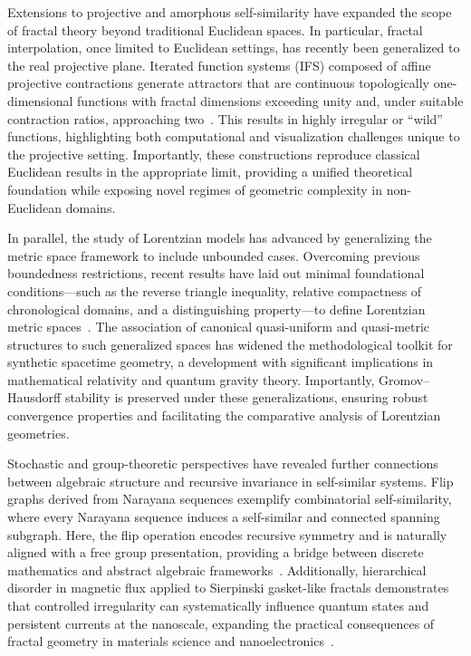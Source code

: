 \documentclass[sigconf]{acmart}
\begin{document}
Extensions to projective and amorphous self-similarity have expanded the scope of fractal theory beyond traditional Euclidean spaces. In particular, fractal interpolation, once limited to Euclidean settings, has recently been generalized to the real projective plane. Iterated function systems (IFS) composed of affine projective contractions generate attractors that are continuous topologically one-dimensional functions with fractal dimensions exceeding unity and, under suitable contraction ratios, approaching two~\cite{ref33}. This results in highly irregular or ``wild'' functions, highlighting both computational and visualization challenges unique to the projective setting. Importantly, these constructions reproduce classical Euclidean results in the appropriate limit, providing a unified theoretical foundation while exposing novel regimes of geometric complexity in non-Euclidean domains.

In parallel, the study of Lorentzian models has advanced by generalizing the metric space framework to include unbounded cases. Overcoming previous boundedness restrictions, recent results have laid out minimal foundational conditions—such as the reverse triangle inequality, relative compactness of chronological domains, and a distinguishing property—to define Lorentzian metric spaces~\cite{ref51}. The association of canonical quasi-uniform and quasi-metric structures to such generalized spaces has widened the methodological toolkit for synthetic spacetime geometry, a development with significant implications in mathematical relativity and quantum gravity theory. Importantly, Gromov--Hausdorff stability is preserved under these generalizations, ensuring robust convergence properties and facilitating the comparative analysis of Lorentzian geometries.

Stochastic and group-theoretic perspectives have revealed further connections between algebraic structure and recursive invariance in self-similar systems. Flip graphs derived from Narayana sequences exemplify combinatorial self-similarity, where every Narayana sequence induces a self-similar and connected spanning subgraph. Here, the flip operation encodes recursive symmetry and is naturally aligned with a free group presentation, providing a bridge between discrete mathematics and abstract algebraic frameworks~\cite{ref56}. Additionally, hierarchical disorder in magnetic flux applied to Sierpinski gasket-like fractals demonstrates that controlled irregularity can systematically influence quantum states and persistent currents at the nanoscale, expanding the practical consequences of fractal geometry in materials science and nanoelectronics~\cite{ref37}.
\end{document}
